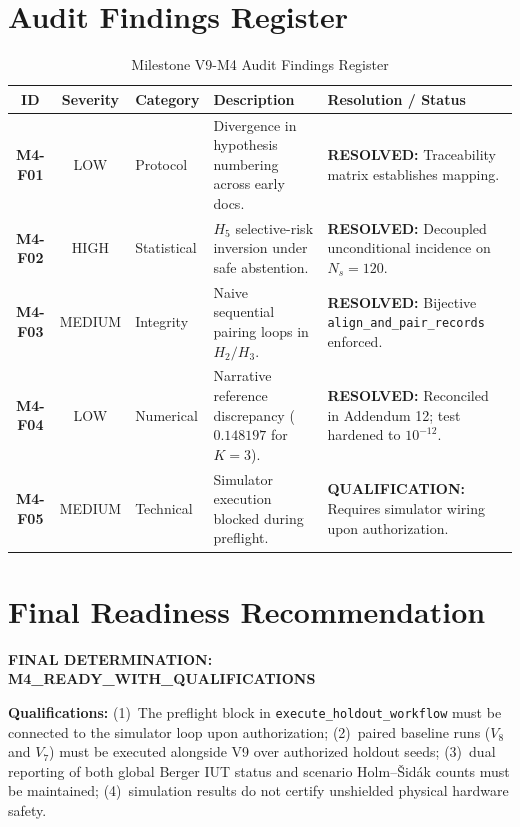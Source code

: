 \documentclass[10pt,a4paper]{article}
\begin{document}
\section{Audit Findings Register}

\begin{table}[htbp]
\centering
\small
\caption{Milestone V9-M4 Audit Findings Register}
\label{tab:findings}
\begin{tabularx}{\textwidth}{cclXX}
\toprule
\textbf{ID} & \textbf{Severity} & \textbf{Category} & \textbf{Description} & \textbf{Resolution / Status} \\
\midrule
\textbf{M4-F01} & LOW & Protocol & Divergence in hypothesis numbering across early docs. & \textbf{RESOLVED:} Traceability matrix establishes mapping. \\
\textbf{M4-F02} & HIGH & Statistical & $H_5$ selective-risk inversion under safe abstention. & \textbf{RESOLVED:} Decoupled unconditional incidence on $N_s=120$. \\
\textbf{M4-F03} & MEDIUM & Integrity & Naive sequential pairing loops in $H_2/H_3$. & \textbf{RESOLVED:} Bijective \texttt{align\_and\_pair\_records} enforced. \\
\textbf{M4-F04} & LOW & Numerical & Narrative reference discrepancy ($0.148197$ for $K=3$). & \textbf{RESOLVED:} Reconciled in Addendum 12; test hardened to $10^{-12}$. \\
\textbf{M4-F05} & MEDIUM & Technical & Simulator execution blocked during preflight. & \textbf{QUALIFICATION:} Requires simulator wiring upon authorization. \\
\bottomrule
\end{tabularx}
\end{table}

\section{Final Readiness Recommendation}

\begin{center}
\large \textbf{FINAL DETERMINATION: M4\_READY\_WITH\_QUALIFICATIONS}
\end{center}

\noindent \textbf{Qualifications:} (1)~The preflight block in \texttt{execute\_holdout\_workflow} must be connected to the simulator loop upon authorization; (2)~paired baseline runs ($V_8$ and $V_7$) must be executed alongside V9 over authorized holdout seeds; (3)~dual reporting of both global Berger IUT status and scenario Holm--Šidák counts must be maintained; (4)~simulation results do not certify unshielded physical hardware safety.
\end{document}
